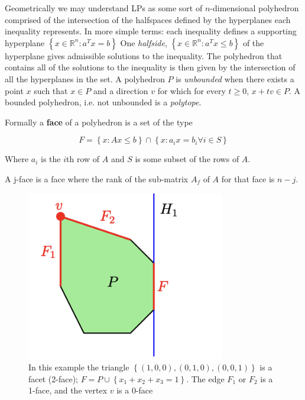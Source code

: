 \documentclass[../notes.tex]{subfiles}
\begin{document}
Geometrically we may understand LPs as some sort of $ n $-dimensional polyhedron comprised of the intersection of the halfspaces defined by the hyperplanes each inequality represents.
In more simple terms: each inequality defines a supporting hyperplane $ \left\{ x \in \mathbb{R}^n : a^Tx = b \right\}  $ One \textit{halfside}, $ \left\{ x \in \mathbb{R}^n: a^T x \le  b \right\}  $ of the hyperplane gives admissible solutions to the inequality.
The polyhedron that contains all of the solutions to the inequality is then given by the intersection of all the hyperplanes in the set.
A polyhedron $ P $ is \textit{unbounded} when there exists a point $ x $ such that $ x \in P $ and a direction $ v $ for which for every $ t \ge  0 $, $ x + tv \in P $. A bounded polyhedron, i.e. not unbounded is a \textit{polytope}.

\begin{definition}
Formally a \textbf{face} of a polyhedron is a set of the type 

\begin{equation}
    F = \left\{  x : Ax \le  b \right\}  \cap \left\{  x : a_ix = b_i \forall i \in S \right\}
\end{equation}

Where $ a_i $ is the $ i $th row of $ A $ and $ S $ is some subset of the rows of $ A $. 

A {j-face} is a face where the rank of the sub-matrix $ A_f $ of $ A $ for that face is $ n-j $. 

\begin{figure}[H]
    \centering
    \includegraphics[width=0.8\linewidth]{img/image_2023-03-08-16-28-53.png}
    \caption{In this example the triangle $ \left\{ (1,0,0), (0,1,0), (0,0,1) \right\}  $ is a facet (2-face); $ F = P \cup \left\{ x_1 + x_2 + x_3 = 1 \right\}  $. The edge $ F_1 $ or $ F_2 $ is a 1-face, and the vertex $  v $ is a 0-face}
\end{figure}
 
    
\end{definition}
\end{document}
